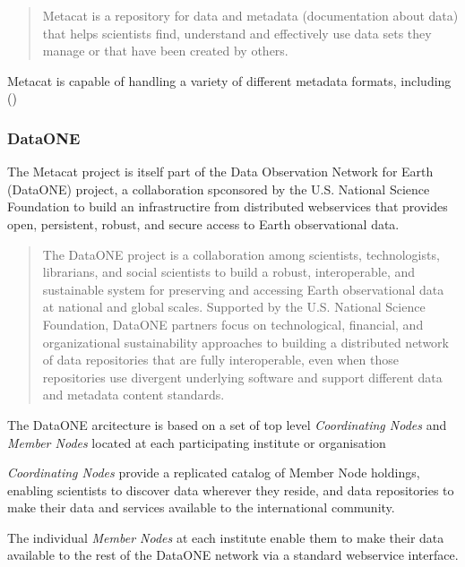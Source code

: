 \documentclass{article}
\begin{document}
\begin{quote}
Metacat is a repository for data and metadata (documentation about data) that
helps scientists find, understand and effectively use data sets they manage or
that have been created by others.
\end{quote}

Metacat is capable of handling a variety of different metadata formats,
including
 (\cite{eml})



\subsubsection{DataONE}

The Metacat project is itself part of the Data Observation Network for Earth (DataONE)
project, a collaboration spconsored by the U.S. National Science Foundation to build
an infrastructire from distributed webservices that provides open, persistent, robust,
and secure access to Earth observational data.
 
\begin{quote}
The DataONE project is a collaboration among scientists, technologists,
librarians, and social scientists to build a robust, interoperable, and
sustainable system for preserving and accessing Earth observational data at
national and global scales. Supported by the U.S. National Science Foundation,
DataONE partners focus on technological, financial, and organizational
sustainability approaches to building a distributed network of data repositories
that are fully interoperable, even when those repositories use divergent
underlying software and support different data and metadata content standards.
\end{quote}

The DataONE arcitecture is based on a set of top level 
\textit{Coordinating Nodes}
and
\textit{Member Nodes}
located at each participating institute or organisation

\textit{Coordinating Nodes}
provide a replicated catalog of Member Node holdings, enabling
scientists to discover data wherever they reside,
and data repositories to make their data and services available
to the international community.

The individual \textit{Member Nodes}
at each institute enable them to make their data available
to the rest of the DataONE network
via a standard webservice interface.
\end{document}

